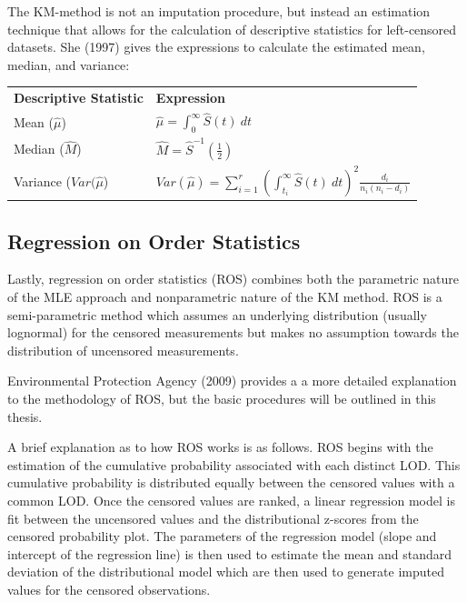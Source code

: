 \documentclass[12pt, twoside]{amherstthesis}
\begin{document}
The KM-method is not an imputation procedure, but instead an estimation technique that allows for the calculation of descriptive statistics for left-censored datasets. She (1997) gives the expressions to calculate the estimated mean, median, and variance:
\begin{table}[h]
\begin{tabular}{ll}
\textbf{Descriptive Statistic} & \textbf{Expression}                                                                                              \\
Mean ($\hat{\mu}$)             & $\hat{\mu} = \displaystyle \int_{0}^{\infty} \hat{S}(t) \ dt$                                                    \\
Median ($\hat{M}$)             & $\hat{M} = \displaystyle \hat{S}^{-1} \left (\frac{1}{2} \right)$                                                              \\
Variance ($Var(\hat{\mu}$)     & $Var(\hat{\mu}) = \displaystyle \sum_{i=1}^{r} \left( \int_{t_i}^{\infty}\hat{S}(t) \ dt \right)^2 \frac{d_i}{n_i(n_i - d_i)}$
\end{tabular}
\end{table}
\hypertarget{ROS}{%
\subsection{Regression on Order Statistics}\label{ROS}}

Lastly, regression on order statistics (ROS) combines both the parametric nature of the MLE approach and nonparametric nature of the KM method. ROS is a semi-parametric method which assumes an underlying distribution (usually lognormal) for the censored measurements but makes no assumption towards the distribution of uncensored measurements.

Environmental Protection Agency (2009) provides a a more detailed explanation to the methodology of ROS, but the basic procedures will be outlined in this thesis.

A brief explanation as to how ROS works is as follows. ROS begins with the estimation of the cumulative probability associated with each distinct LOD. This cumulative probability is distributed equally between the censored values with a common LOD. Once the censored values are ranked, a linear regression model is fit between the uncensored values and the distributional z-scores from the censored probability plot. The parameters of the regression model (slope and intercept of the regression line) is then used to estimate the mean and standard deviation of the distributional model which are then used to generate imputed values for the censored observations.
\end{document}
